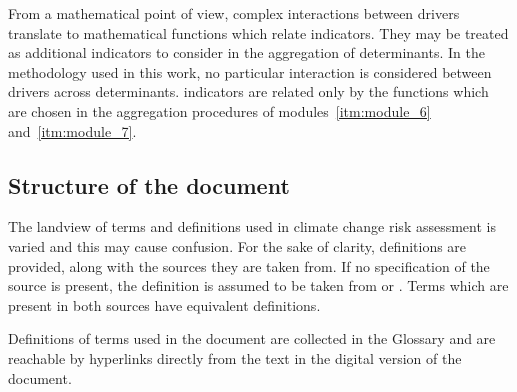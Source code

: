 From a mathematical point of view, complex interactions between \glspl{driver} translate to mathematical functions which relate \glspl{indicator}. They may be treated as additional \glspl{indicator} to consider in the aggregation of \glspl{determinant}.\cite[39-40]{2008OECDHandbookOn}
In the methodology used in this work, no particular interaction is considered between \glspl{driver} across \glspl{determinant}. \Glspl{indicator} are related only by the functions which are chosen in the aggregation procedures of modules~\ref{itm:module_6} and~\ref{itm:module_7}.



\subsection{Structure of the document}
The landview of terms and definitions used in climate change risk assessment is varied and this may cause confusion. For the sake of clarity, definitions are provided, along with the sources they are taken from.
If no specification of the source is present, the definition is assumed to be taken from \cite{2021ISO14091} or \cite{2021MatthewsAnnexVII}. Terms which are present in both sources have equivalent definitions.

Definitions of terms used in the document are collected in the Glossary and are reachable by hyperlinks directly from the text in the digital version of the document.
